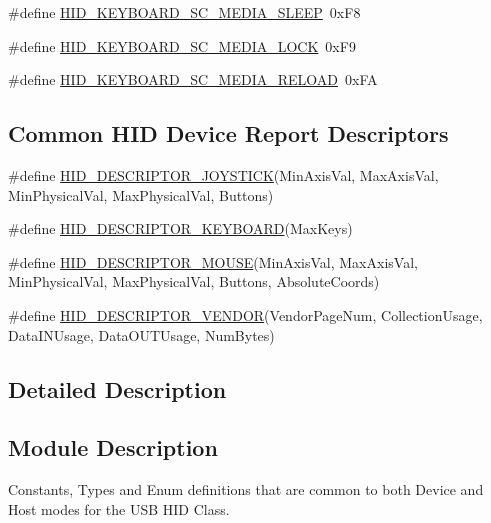 \begin{DoxyCompactItemize}
\item 
\#define \hyperlink{group__Group__USBClassHIDCommon_ga8ead013f81a19b24b697ddeef982d640}{H\+I\+D\+\_\+\+K\+E\+Y\+B\+O\+A\+R\+D\+\_\+\+S\+C\+\_\+\+M\+E\+D\+I\+A\+\_\+\+S\+L\+E\+EP}~0x\+F8
\item 
\#define \hyperlink{group__Group__USBClassHIDCommon_gad905d8e008afde0ade92af28195a7200}{H\+I\+D\+\_\+\+K\+E\+Y\+B\+O\+A\+R\+D\+\_\+\+S\+C\+\_\+\+M\+E\+D\+I\+A\+\_\+\+L\+O\+CK}~0x\+F9
\item 
\#define \hyperlink{group__Group__USBClassHIDCommon_ga804994a053b2af06f759da136f55ca9e}{H\+I\+D\+\_\+\+K\+E\+Y\+B\+O\+A\+R\+D\+\_\+\+S\+C\+\_\+\+M\+E\+D\+I\+A\+\_\+\+R\+E\+L\+O\+AD}~0x\+FA
\end{DoxyCompactItemize}
\subsection*{Common H\+ID Device Report Descriptors}
\begin{DoxyCompactItemize}
\item 
\#define \hyperlink{group__Group__USBClassHIDCommon_gaf7fe5010c1c53d18c53abfa5830242f3}{H\+I\+D\+\_\+\+D\+E\+S\+C\+R\+I\+P\+T\+O\+R\+\_\+\+J\+O\+Y\+S\+T\+I\+CK}(Min\+Axis\+Val,  Max\+Axis\+Val,  Min\+Physical\+Val,  Max\+Physical\+Val,  Buttons)
\item 
\#define \hyperlink{group__Group__USBClassHIDCommon_gad35eff1f0b6be97fee28f17bf5e54106}{H\+I\+D\+\_\+\+D\+E\+S\+C\+R\+I\+P\+T\+O\+R\+\_\+\+K\+E\+Y\+B\+O\+A\+RD}(Max\+Keys)
\item 
\#define \hyperlink{group__Group__USBClassHIDCommon_ga9094a4f76840f1ef8d688cd729935d47}{H\+I\+D\+\_\+\+D\+E\+S\+C\+R\+I\+P\+T\+O\+R\+\_\+\+M\+O\+U\+SE}(Min\+Axis\+Val,  Max\+Axis\+Val,  Min\+Physical\+Val,  Max\+Physical\+Val,  Buttons,  Absolute\+Coords)
\item 
\#define \hyperlink{group__Group__USBClassHIDCommon_ga43c5b83e57ba1936d252bf58931f40a2}{H\+I\+D\+\_\+\+D\+E\+S\+C\+R\+I\+P\+T\+O\+R\+\_\+\+V\+E\+N\+D\+OR}(Vendor\+Page\+Num,  Collection\+Usage,  Data\+I\+N\+Usage,  Data\+O\+U\+T\+Usage,  Num\+Bytes)
\end{DoxyCompactItemize}


\subsection{Detailed Description}
\hypertarget{group__Group__USBClassHIDCommon_Sec_USBClassHIDCommon_ModDescription}{}\subsection{Module Description}\label{group__Group__USBClassHIDCommon_Sec_USBClassHIDCommon_ModDescription}
Constants, Types and Enum definitions that are common to both Device and Host modes for the U\+SB H\+ID Class. 

